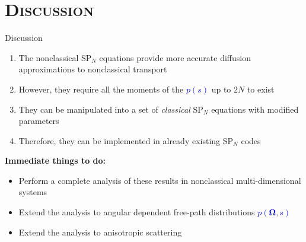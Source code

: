 \documentclass[xcolor=x11names, compress]{beamer}
\renewcommand{\(}{\begin{columns}}
\renewcommand{\)}{\end{columns}}
\newcommand{\<}[1]{\begin{column}{#1}}
\renewcommand{\>}{\end{column}}
\newcommand{\uom}{{\bm\Omega}}
\begin{document}
\section{\scshape Discussion}


\begin{frame}[fragile]{Discussion}
\begin{enumerate}
\item The nonclassical SP$_N$ equations provide more accurate diffusion approximations to nonclassical transport 
\item  However, they require all the moments of the \textcolor{blue}{$p(s)$} up to $2N$ to exist
\item They can be manipulated into a set of \textit{classical} SP$_N$ equations with modified parameters
\item Therefore, they can be implemented in already existing SP$_N$ codes
\end{enumerate}

\textbf{Immediate things to do:}
\begin{itemize}
\item Perform a complete analysis of these results in nonclassical multi-dimensional systems
\item Extend the analysis to angular dependent free-path distributions \textcolor{blue}{$p(\uom,s)$}
\item Extend the analysis to anisotropic scattering
\end{itemize}
\end{frame}
\end{document}
